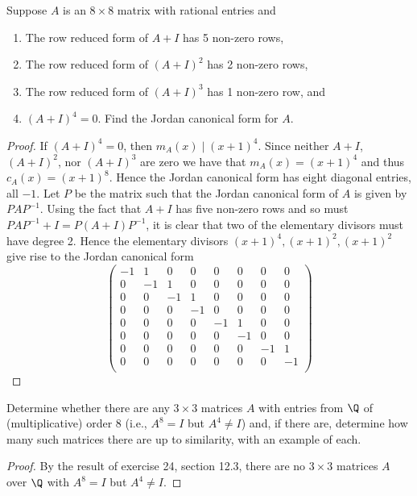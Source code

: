 \documentclass[10pt]{amsart}
\begin{document}
\begin{thm}
  \label{Ex3}
  Suppose $A$ is an $8 \times 8$ matrix with rational entries and 
  \begin{enumerate}
    \renewcommand{\theenumi}{\roman{enumi}.}
    \renewcommand{\labelenumi}{\theenumi}
  \item
    The row reduced form of $A + I$ has 5 non-zero rows,
  \item
    The row reduced form of $(A+I)^2$ has 2 non-zero rows,
  \item
    The row reduced form of $(A+I)^3$ has 1 non-zero row, and
  \item
    $(A+I)^4 = 0$.
    Find the Jordan canonical form for $A$.
  \end{enumerate}
  \begin{proof}
    If $(A+I)^4 = 0$, then $m_A(x) \mid (x+1)^4$.
    Since neither $A+I$, $(A+I)^2$, nor $(A+I)^3$ are zero we have that $m_A(x) = (x+1)^4$ and thus $c_A(x) = (x+1)^8$.
    Hence the Jordan canonical form has eight diagonal entries, all $-1$.
    Let $P$ be the matrix such that the Jordan canonical form of $A$ is given by $PAP^{-1}$.
    Using the fact that $A+I$ has five non-zero rows and so must $PAP^{-1} +I = P(A+I)P^{-1}$, it is clear that two of the elementary divisors must have degree 2.
    Hence the elementary divisors $(x+1)^4, (x+1)^2, (x+1)^2$ give rise to the Jordan canonical form
    $$
    \begin{pmatrix}
      -1 & 1 & 0 & 0 & 0 & 0 & 0 & 0\\
      0 & - 1 & 1 & 0 & 0 & 0 & 0 & 0\\
      0 & 0 & -1 & 1 & 0 & 0 & 0 & 0\\
      0 & 0 & 0 & -1 & 0 & 0 & 0 & 0\\
      0 & 0 & 0 & 0  & -1 & 1 & 0 & 0\\
      0 & 0 & 0 & 0  & 0 & -1 & 0 & 0\\
      0 & 0 & 0 & 0  & 0 & 0 & -1 & 1\\
      0 & 0 & 0 & 0  & 0 & 0 & 0 & -1\\
    \end{pmatrix}
    $$
  \end{proof}
\end{thm}

\begin{thm}
  \label{Ex4}
  Determine whether there are any $3\times3$ matrices $A$ with entries from $\Q$ of (multiplicative) order 8 (i.e., $A^8 = I$ but $A^4 \neq I$) and, if there are, determine how many such matrices there are up to similarity, with an example of each.
  \begin{proof}
    By the result of exercise 24, section 12.3, there are no $3\times3$ matrices $A$ over $\Q$ with $A^8 = I$ but $A^4 \neq I$.
  \end{proof}
\end{thm}
\end{document}

